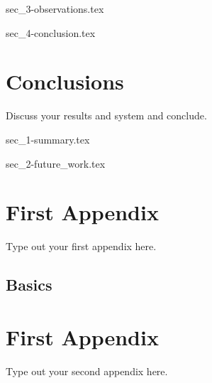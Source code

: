 \documentclass[a4paper,oneside,12pt]{report}
\begin{document}
{sec_3-observations.tex}
\label{se:observations}

{sec_4-conclusion.tex}
\label{se:conclusion}

\chapter{Conclusions}
\label{ch:conc}

Discuss your results and system and conclude.

{sec_1-summary.tex}

{sec_2-future_work.tex}

\appendix
\chapter{First Appendix}
Type out your first appendix here.
\section{Basics}

\chapter{First Appendix}
Type out your second appendix here.

\graphicspath{ {./images/} }



\end{document}
